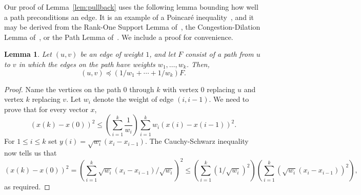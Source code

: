 \documentclass[11pt]{article}
\newtheorem{lemma}[theorem]{Lemma}
\def\pleq{\preccurlyeq}
\def\pleq{\preccurlyeq}
\begin{document}
Our proof of Lemma~\ref{lem:pullback} uses the following lemma bounding
  how well a path preconditions an edge.
It is an example of a Poincar{\'e} inequality~\cite{DiaconisStrook},
  and it may be derived from  the
  Rank-One Support Lemma of~\cite{SupportTheory},
  the Congestion-Dilation Lemma of~\cite{SupportGraph},
  or the Path Lemma of~\cite{SpielmanTengLinsolve}.
We include a proof for convenience.
\begin{lemma}\label{lem:Path}
Let $(u,v)$ be an edge of weight $1$,
  and let $F$ consist of a path from $u$ to $v$ in which
  the edges on the path have weights
  $w_{1}, \dotsc , w_{k}$.
Then,
\[
(u,v) \pleq \left(1/w_{1} + \dotsb + 1/w_{k} \right) F.
\]
\end{lemma}
\begin{proof}
Name the vertices on the path $0$ through $k$ with vertex $0$
  replacing $u$ and vertex $k$ replacing $v$.
Let $w_{i}$ denote the weight of edge $(i,i-1)$.
We need to prove that for every vector $x$,
\[
  \left(x (k) - x (0) \right)^{2} \leq 
  \left(\sum_{i=1}^{k} \frac{1}{w_{i}} \right) 
  \sum_{i=1}^{k} w_{i} (x (i) - x (i-1))^{2}.
\]
For $1 \leq i \leq k$ set $y (i) = \sqrt{w_{i}} (x_{i}-x_{i-1}) $.
The Cauchy-Schwarz inequality now tells us that
\[
    \left(x (k) - x (0) \right)^{2}
= 
\left(\sum_{i=1}^{k} \sqrt{w_{i}} (x_{i}-x_{i-1}) / \sqrt{w_{i}} \right)^{2}
\leq 
\left(\sum_{i=1}^{k} \left(1 / \sqrt{w_{i}} \right)^{2} \right)
\left(\sum_{i=1}^{k} \left(\sqrt{w_{i}} (x_{i}-x_{i-1}) \right)^{2}
\right),
\]
as required.
\end{proof}
\end{document}
